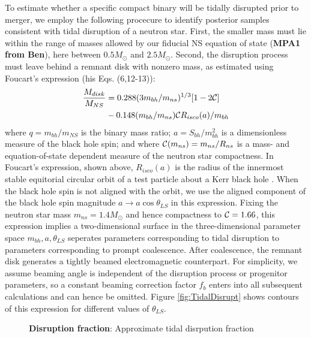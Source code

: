 \documentclass[nofootinbib,twocolumn,prd]{emulateapj}
\begin{document}
To estimate whether a specific compact binary will be tidally disrupted prior to merger, we employ the
following procecure to identify posterior samples consistent with tidal disruption of a neutron star.  First, the
smaller mass must lie within the range of masses allowed by our fiducial NS equation of state (\textbf{MPA1 from Ben}), here
between $0.5 M_\odot$ and $2.5 M_\odot$.  Second, the disruption process must leave behind a remnant disk with nonzero
mass, as estimated using Foucart's expression \cite{2012PhRvD..86l4007F} (his Eqs. (6,12-13)):
\begin{align}
\frac{M_{disk}}{M_{NS}} &=
 0.288 (3 m_{bh}/m_{ns})^{1/3}[1-2 {\cal C}] 
\nonumber \\
&
 -0.148 (m_{bh}/m_{ns})  {\cal C} R_{isco}(a)/m_{bh} 
\label{eq:Mdisk}
\end{align}
where $q=m_{bh}/m_{NS}$ is the binary mass ratio; $a=S_{bh}/m_{bh}^2$ is a dimensionless measure of the black hole spin;
and  where ${\cal C}(m_{ns})=m_{ns}/R_{ns}$ is a mass- and equation-of-state dependent  measure of the neutron star
compactness.  In Foucart's expression, shown above, $R_{isco}(a)$ is the radius of the  innermost stable equitorial circular orbit  of a test particle
about a Kerr black hole  \cite{1972ApJ...178..347B}. %
When the black hole spin is not aligned with the orbit, we use the aligned component of the black hole spin magnitude $a\rightarrow a \cos \theta_{LS}$ in this
expression.   Fixing the neutron star mass $m_{ns}=1.4 M_\odot$ and hence compactness to ${\cal C}=1.66$, this expression implies a two-dimensional surface in
the three-dimensional parameter space $m_{bh},a,\theta_{LS}$ seperates parameters corresponding to tidal disruption to
parameters corresponding to prompt coalescence.
%
After coalescence, the remnant disk generates a tightly beamed electromagnetic counterpart.  For simplicity, we assume
beaming angle is independent of the disruption process or progenitor parameters, so a constant beaming correction factor $f_b$ enters into all
subsequent calculations and can hence be omitted.  
%
Figure \ref{fig:TidalDisrupt} shows contours of this expression for different values of $\theta_{LS}$.

\begin{figure}
\caption{\textbf{Disruption fraction}: Approximate tidal disrpution fraction}
\end{figure}
\end{document}
